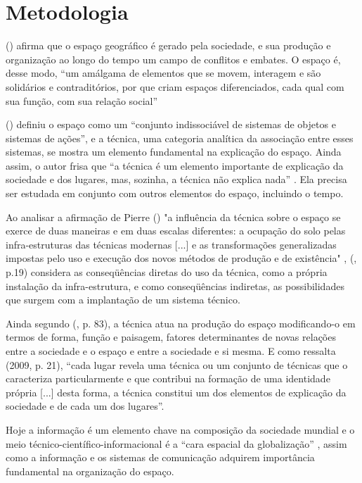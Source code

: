 \section{Metodologia}

 (\citeyear{isnard}) afirma que o espaço geográfico é gerado pela sociedade, e sua produção e organização ao longo do tempo um campo de conflitos e embates. O espaço é, desse modo, “um amálgama de elementos que se movem, interagem e são solidários e contraditórios, por que criam espaços diferenciados, cada qual com sua função, com sua relação social” \cite{mondardo}

 (\citeyear{santos1996}) definiu o espaço como um “conjunto indissociável de sistemas de objetos e sistemas de ações”, e a técnica, uma categoria analítica da associação entre esses sistemas, se mostra um elemento fundamental na explicação do espaço. Ainda assim, o autor frisa que “a técnica é um elemento importante de explicação da sociedade e dos lugares, mas, sozinha, a técnica não explica nada” \cite[p. 27]{santos1996}. Ela precisa ser estudada em conjunto com outros elementos do espaço, incluindo o tempo.

Ao analisar a afirmação de Pierre  (\citeyear{george1974}) "a influência da técnica sobre o espaço se exerce de duas maneiras e em duas escalas diferentes: a ocupação do solo pelas infra-estruturas das técnicas modernas [...] e as transformações generalizadas impostas pelo uso e execução dos novos métodos de produção e de existência" \cite[p. 13]{george1974},  (\citeyear{santos1996}, p.19) considera as conseqüências diretas do uso da técnica, como a própria instalação da infra-estrutura, e como conseqüências indiretas, as possibilidades que surgem com a implantação de um sistema técnico. 

Ainda segundo  (\citeyear{santos1996}, p. 83), a técnica atua na produção do espaço modificando-o em termos de forma, função e paisagem, fatores determinantes de novas relações entre a sociedade e o espaço e entre a sociedade e si mesma. E como ressalta  (2009, p. 21), “cada lugar revela uma técnica ou um conjunto de técnicas que o caracteriza particularmente e que contribui na formação de uma identidade própria [...] desta forma, a técnica constitui um dos elementos de explicação da sociedade e de cada um dos lugares”.
 
Hoje a informação é um elemento chave na composição da sociedade mundial e o meio técnico-científico-informacional é a “cara espacial da globalização” \cite{santos1996}, assim como a informação e os sistemas de comunicação adquirem importância fundamental na organização do espaço.

